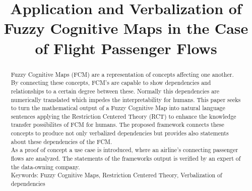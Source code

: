 \documentclass[conference]{IEEEtran}
\begin{document}
\title{Application and Verbalization of Fuzzy Cognitive Maps in the Case of Flight Passenger Flows}

\author{
\and
{}
\and
{}
}

\maketitle

\begin{abstract}
Fuzzy Cognitive Maps (FCM) are a representation of concepts affecting one another. By connecting these concepts, FCM's are capable to show dependencies and relationships to a certain degree between these.  Normally this dependencies are numerically translated which impedes the interpretability for humans. This paper seeks to turn the mathematical output of a Fuzzy Cognitive Map into natural language sentences applying the Restriction Centered Theory (RCT) to enhance the knowledge transfer possibilites of FCM for humans. The proposed framework connects these concepts to produce not only verbalized dependencies but provides also statements about these dependencies of the FCM. \\
As a proof of concept a use case is introduced, where an airline's connecting passenger flows are analyzed. The statements of the frameworks output is verified by an expert of the data-owning company.\\
Keywords: Fuzzy Cognitive Maps, Restriction Centered Theory, Verbalization of dependencies
\end{abstract}

	
\IEEEpeerreviewmaketitle
\end{document}
